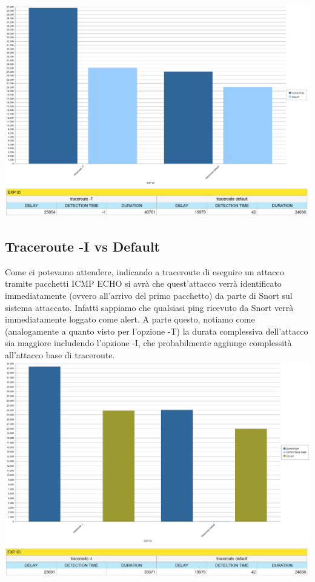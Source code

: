 \includegraphics[scale=0.3]{figure/tempi_traceroute_T.jpg}\\

\includegraphics[scale=0.3]{figure/tabella_traceroute_T.jpg}

\subsection{Traceroute -I vs Default}
Come ci potevamo attendere, indicando a traceroute di eseguire un attacco tramite pacchetti ICMP ECHO si avrà che quest'attacco verrà identificato immediatamente (ovvero all'arrivo del primo pacchetto) da parte di Snort sul sistema attaccato. Infatti sappiamo che qualsiasi ping ricevuto da Snort verrà immediatamente loggato come alert. A parte questo, notiamo come (analogamente a quanto visto per l'opzione -T) la durata complessiva dell'attacco sia maggiore includendo l'opzione -I, che probabilmente aggiunge complessità all'attacco base di traceroute.\\

\includegraphics[scale=0.3]{figure/tempi_traceroute_I.jpg}\\

\includegraphics[scale=0.3]{figure/tabella_traceroute_I.jpg}
